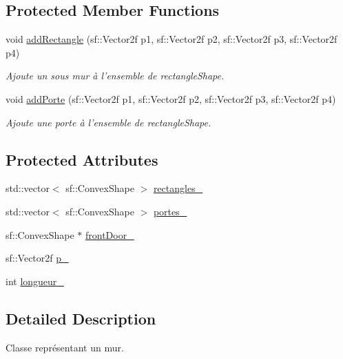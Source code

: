 \subsection*{Protected Member Functions}
\begin{DoxyCompactItemize}
\item 
void \hyperlink{classMurAbstrait_a619ea952d60b1ae27850bc4d2054e8a9}{add\-Rectangle} (sf\-::\-Vector2f p1, sf\-::\-Vector2f p2, sf\-::\-Vector2f p3, sf\-::\-Vector2f p4)
\begin{DoxyCompactList}\small\item\em Ajoute un sous mur à l'ensemble de rectangle\-Shape. \end{DoxyCompactList}\item 
void \hyperlink{classMurAbstrait_a8e2d84ec2ffd01f121ef4589787687cd}{add\-Porte} (sf\-::\-Vector2f p1, sf\-::\-Vector2f p2, sf\-::\-Vector2f p3, sf\-::\-Vector2f p4)
\begin{DoxyCompactList}\small\item\em Ajoute une porte à l'ensemble de rectangle\-Shape. \end{DoxyCompactList}\end{DoxyCompactItemize}
\subsection*{Protected Attributes}
\begin{DoxyCompactItemize}
\item 
std\-::vector$<$ sf\-::\-Convex\-Shape $>$ \hyperlink{classMurAbstrait_acd97813ca3760f3ac81c5ecc674a930a}{rectangles\-\_\-}
\item 
std\-::vector$<$ sf\-::\-Convex\-Shape $>$ \hyperlink{classMurAbstrait_a23ab70f739321ac626be2c59b83cf670}{portes\-\_\-}
\item 
sf\-::\-Convex\-Shape $\ast$ \hyperlink{classMurAbstrait_acbeeab18ec5268cc2b961ec207a267b5}{front\-Door\-\_\-}
\item 
sf\-::\-Vector2f \hyperlink{classMurAbstrait_a620d216e13a772d931294d64caf1554f}{p\-\_\-}
\item 
int \hyperlink{classMurAbstrait_ac7e49466459ab38ee25538917aefd7a2}{longueur\-\_\-}
\end{DoxyCompactItemize}


\subsection{Detailed Description}
Classe représentant un mur. 

